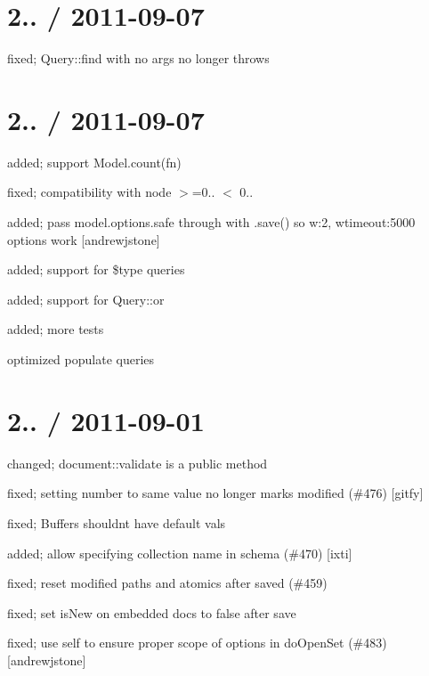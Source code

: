 \section*{2.. / 2011-\/09-\/07 }


\begin{DoxyItemize}
\item fixed; Query\+::find with no args no longer throws
\end{DoxyItemize}

\section*{2.. / 2011-\/09-\/07 }


\begin{DoxyItemize}
\item added; support Model.\+count(fn)
\item fixed; compatibility with node $>$=0.. $<$ 0..
\item added; pass model.\+options.\+safe through with .save() so w\+:2, wtimeout\+:5000 options work \mbox{[}andrewjstone\mbox{]}
\item added; support for \$type queries
\item added; support for Query\+::or
\item added; more tests
\item optimized populate queries
\end{DoxyItemize}

\section*{2.. / 2011-\/09-\/01 }


\begin{DoxyItemize}
\item changed; document\+::validate is a public method
\item fixed; setting number to same value no longer marks modified (\#476) \mbox{[}gitfy\mbox{]}
\item fixed; Buffers shouldn\textquotesingle{}t have default vals
\item added; allow specifying collection name in schema (\#470) \mbox{[}ixti\mbox{]}
\item fixed; reset modified paths and atomics after saved (\#459)
\item fixed; set is\+New on embedded docs to false after save
\item fixed; use self to ensure proper scope of options in do\+Open\+Set (\#483) \mbox{[}andrewjstone\mbox{]}
\end{DoxyItemize}

